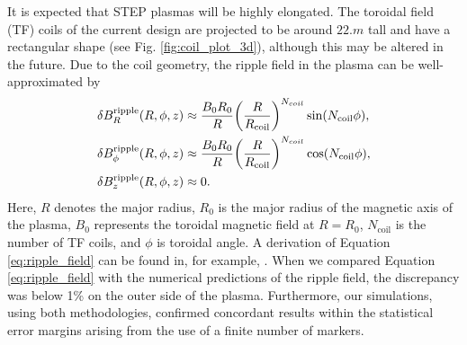 \documentclass[10pt, a4paper, twoside]{article}
\begin{document}
It is expected that STEP plasmas will be highly elongated. The toroidal field (TF) coils of the current design are projected to be around $\si{22.m}$ tall and have a rectangular shape (see Fig. \ref{fig:coil_plot_3d}), although this may be altered in the future. Due to the coil geometry, the ripple field in the plasma can be well-approximated by
\begin{equation}
    \label{eq:ripple_field}
    \begin{aligned}
        \delta B_R^{\text{ripple}}(R, \phi, z) &\approx \frac{B_0 R_0}{R} \qty(\frac{R}{R_{\text{coil}}})^{N_{coil}}\sin(N_{\text{coil}}\phi), \\
        \delta B_\phi^{\text{ripple}}(R, \phi, z) &\approx \frac{B_0 R_0}{R} \qty(\frac{R}{R_{\text{coil}}})^{N_{coil}}\cos(N_{\text{coil}}\phi),\\
        \delta B_z^{\text{ripple}}(R, \phi, z) &\approx 0.
    \end{aligned}
\end{equation}
Here, $R$ denotes the major radius, $R_0$ is the major radius of the magnetic axis of the plasma, $B_0$ represents the toroidal magnetic field at $R=R_0$, $N_{\text{coil}}$ is the number of TF coils, and $\phi$ is toroidal angle. A derivation of Equation \eqref{eq:ripple_field} can be found in, for example, \cite{mcclements2005}. When we compared Equation \eqref{eq:ripple_field} with the numerical predictions of the ripple field, the discrepancy was below 1\% on the outer side of the plasma. Furthermore, our simulations, using both methodologies, confirmed concordant results within the statistical error margins arising from the use of a finite number of markers.
\end{document}
